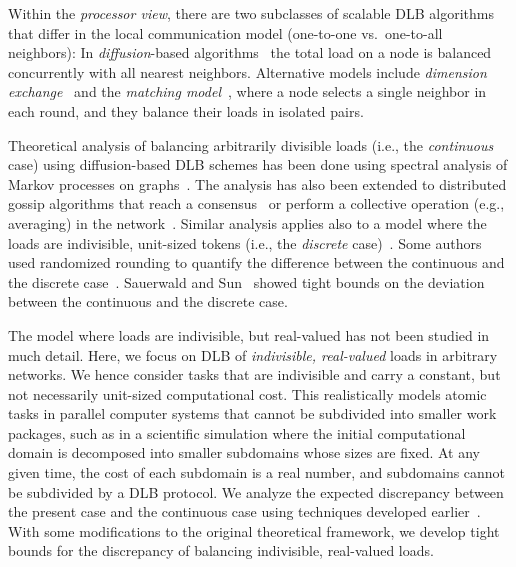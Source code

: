 \documentclass[12pt,psfig,a4]{article}
\theoremstyle{plain}
\begin{document}
Within the \textit{processor view}, there are two subclasses of scalable DLB algorithms that differ in the local communication model (one-to-one vs.~one-to-all neighbors): In \textit{diffusion}-based algorithms~\cite{cybenko1989dynamic,boillat1990load} the total load on a node is balanced concurrently with all nearest neighbors. Alternative models include \textit{dimension exchange}~\cite{cybenko1989dynamic} and the \textit{matching model}~\cite{ghosh1996dynamic}, where a node selects a single neighbor in each round, and they balance their loads in isolated pairs.  

Theoretical analysis of balancing arbitrarily divisible loads (i.e., the \textit{continuous} case) using diffusion-based DLB schemes has been done using spectral analysis of Markov processes on graphs~\cite{rabani1998local,roberts1997weak}. The analysis has also been extended to distributed gossip algorithms that reach a consensus~\cite{aysal2009broadcast} or perform a collective operation (e.g., averaging) in the network~\cite{boyd2006randomized}. Similar analysis applies also to a model where the loads are indivisible, unit-sized tokens (i.e., the \textit{discrete} case)~\cite{ghosh1996dynamic,muthukrishnan1998first}. Some authors used randomized rounding to quantify the difference between the continuous and the discrete case~\cite{rabani1998local,mitzenmacher2001power,friedrich2009near}. Sauerwald and Sun~\cite{sauerwald2012tight} showed tight bounds on the deviation between the continuous and the discrete case. 

The model where loads are indivisible, but real-valued has not been studied in much detail. Here, we focus on DLB of \textit{indivisible, real-valued} loads in arbitrary networks. We hence consider tasks that are indivisible and carry a constant, but not necessarily unit-sized computational cost. This realistically models atomic tasks in parallel computer systems that cannot be subdivided into smaller work packages, such as in a scientific simulation where the initial computational domain is decomposed into smaller subdomains whose sizes are fixed. At any given time, the cost of each subdomain is a real number, and subdomains cannot be subdivided by a DLB protocol. We analyze the expected discrepancy between the present case and the continuous case using techniques developed earlier~\cite{sauerwald2012tight}. With some modifications to the original theoretical framework, we develop  tight bounds for the discrepancy of balancing indivisible, real-valued loads. 
\end{document}
